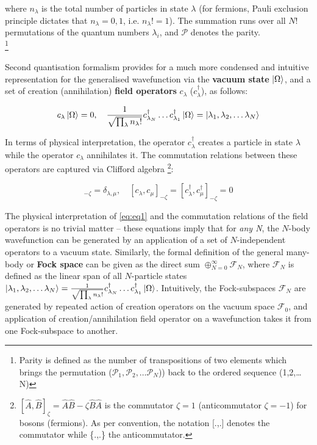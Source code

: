 where $n_{\lambda}$ is the total number of particles in state $\lambda$ (for fermions, Pauli exclusion principle dictates that $n_{\lambda} = 0,1$, i.e. $n_{\lambda}! = 1$). The summation runs over all $N!$ permutations of the quantum numbers $\lambda_{i}$, and $\mathcal{P}$ denotes the parity. \\ \footnote{Parity is defined as the number of transpositions of two elements which brings the permutation ($\mathcal{P}_1, \mathcal{P}_2,\ldots \mathcal{P}_{N}$)) back to the ordered sequence (1,2,\ldots N)}

Second quantisation formalism provides for a much more condensed and intuitive representation for the generalised wavefunction via the \textbf{vacuum state} $\ket{\Omega}$, and a set of creation (annihilation) \textbf{field operators} $c_{\lambda}$ ($c_{\lambda}^{\dagger}$), as follows:

\begin{equation}
\label{eq:eq1}
    c_{\lambda} \ket{\Omega} = 0, \quad \frac{1}{\sqrt{\prod_{\lambda}n_{\lambda}!}} c_{\lambda_N}^{\dagger} \ldots c_{\lambda_1}^{\dagger} \ket{\Omega} = \ket{\lambda_{1}, \lambda_{2},\ldots \lambda_{N}}
\end{equation}

In terms of physical interpretation, the operator $c_{\lambda}^{\dagger}$ creates a particle in state $\lambda$ while the operator $c_{\lambda}$ annihilates it. The commutation relations between these operators are captured via Clifford algebra \footnote{$[\hat{A},\hat{B}]_{\zeta} = \hat{A}\hat{B}-\zeta \hat{B}\hat{A}$ is the commutator $\zeta = 1$ (anticommutator $\zeta = -1$) for bosons (fermions). As per convention, the notation [.,.] denotes the commutator while \{.,.\} the anticommutator.}:

\begin{equation}
    [c_{\lambda},c_{\mu}^{\dagger}]_{-\zeta} = \delta_{\lambda,\mu}, \quad [c_{\lambda},c_{\mu}]_{-\zeta} = [c_{\lambda}^{\dagger},c_{\mu}^{\dagger}]_{-\zeta} = 0
\end{equation}

The physical interpretation of \ref{eq:eq1} and the commutation relations of the field operators is no trivial matter -- these equations imply that for \textit{any N}, the $N$-body wavefunction can be generated by an application of a set of $N$-independent operators to a vacuum state. Similarly, the formal definition of the general many-body or \textbf{Fock space} can be given as the direct sum $\oplus_{N=0}^{\infty}\mathcal{F}_N$, where $\mathcal{F}_N$ is defined as the linear span of all $N$-particle states $\ket{\lambda_{1}, \lambda_{2},\ldots \lambda_{N}} = \frac{1}{\sqrt{\prod_{\lambda}n_{\lambda}!}} c_{\lambda_N}^{\dagger} \ldots c_{\lambda_1}^{\dagger} \ket{\Omega}$. Intuitively, the Fock-subspaces $\mathcal{F}_N$ are generated by repeated action of creation operators on the vacuum space $\mathcal{F}_0$, and application of creation/annihilation field operator on a wavefunction takes it from one Fock-subspace to another. \\ 

